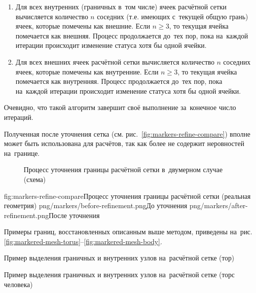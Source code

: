 \documentclass[thesis.tex]{subfiles}
\begin{document}
    \begin{enumerate}
        \item Для всех внутренних (граничных в~том числе) ячеек расчётной сетки вычисляется количество $n$ соседних
              (т.е. имеющих с~текущей общую грань) ячеек, которые помечены как внешние. Если $n\geq 3$, то
              текущая ячейка помечается как внешняя. Процесс продолжается до~тех пор, пока на~каждой итерации происходит
              изменение статуса хотя бы одной ячейки.
        \item Для всех внешних ячеек расчётной сетки вычисляется количество $n$ соседних ячеек, которые помечены как
              внутренние. Если $n\geq 3$, то текущая ячейка помечается как внутренняя. Процесс продолжается до~тех пор,
              пока на~каждой итерации происходит изменение статуса хотя бы одной ячейки.
    \end{enumerate}

    Очевидно, что такой алгоритм завершит своё выполнение за~конечное число итераций.

    Полученная после уточнения сетка  (см. рис.~\ref{fig:markers-refine-compare}) вполне может быть использована для
    расчётов, так как более не содержит неровностей на~границе.

    \begin{figure}[ht!]
        \centering
            {}
            {}
        \caption{Процесс уточнения границы расчётной сетки в~двумерном случае (схема)}
        \label{fig:markers-refine-scheme}
    \end{figure}

    \twofigsH
        {fig:markers-refine-compare}{Процесс уточнения границы расчётной сетки (реальная геометрия)}
        {png/markers/before-refinement.png}{До уточнения}
        {png/markers/after-refinement.png}{После уточнения}

    Примеры границ, восстановленных описанным выше методом, приведены на~рис.
    \ref{fig:markered-mesh-torus}--\ref{fig:markered-mesh-body}.

            {Пример выделения граничных и внутренних узлов на~расчётной сетке (тор)}

            {Пример выделения граничных и внутренних узлов на~расчётной сетке (торс человека)}
\end{document}
